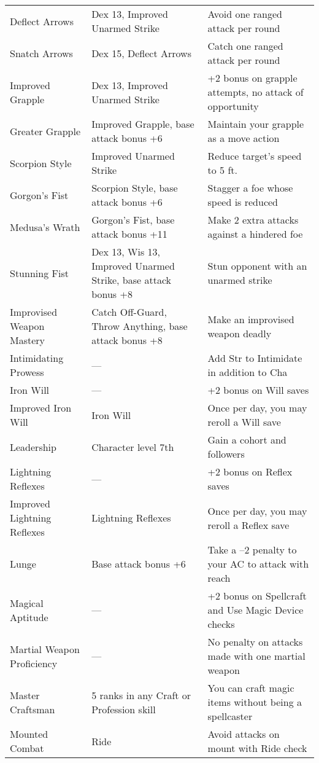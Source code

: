 \begin{table*}
\begin{tabularx}{\linewidth}{lXl}
\quad Deflect Arrows & Dex 13,  Improved Unarmed Strike & Avoid one ranged attack per round\\
\quad \quad Snatch Arrows & Dex 15, Deflect Arrows & Catch one ranged attack per round\\
\quad Improved Grapple & Dex 13, Improved Unarmed Strike & +2 bonus on grapple attempts, no attack of opportunity\\
\quad \quad Greater Grapple & Improved Grapple, base attack bonus +6 & Maintain your grapple as a move action\\
\quad Scorpion Style & Improved Unarmed Strike & Reduce target's speed to 5 ft.\\
\quad \quad Gorgon's Fist & Scorpion Style, base attack bonus +6 & Stagger a foe whose speed is reduced\\
\quad \quad \quad Medusa's Wrath & Gorgon's Fist, base attack bonus +11 & Make 2 extra attacks against a hindered foe\\
\quad Stunning Fist & Dex 13, Wis 13, Improved Unarmed Strike, base attack bonus +8 & Stun opponent with an unarmed strike\\
Improvised Weapon Mastery & Catch Off-Guard, Throw Anything, base attack bonus +8 & Make an improvised weapon deadly\\
Intimidating Prowess & --- & Add Str to Intimidate in addition to Cha \\
Iron Will & --- & +2 bonus on Will saves\\
\quad Improved Iron Will & Iron Will & Once per day, you may reroll a Will save\\
Leadership & Character level 7th & Gain a cohort and followers\\
Lightning Reflexes & --- & +2 bonus on Reflex saves\\
\quad Improved Lightning Reflexes & Lightning Reflexes & Once per day, you may reroll a Reflex save\\
Lunge & Base attack bonus +6 & Take a –2 penalty to your AC to attack with reach\\
Magical Aptitude & --- & +2 bonus on Spellcraft and Use Magic Device checks\\
Martial Weapon Proficiency & --- & No penalty on attacks made with one martial weapon\\
Master Craftsman & 5 ranks in any Craft or Profession skill & You can craft magic items without being a spellcaster\\
Mounted Combat & Ride & Avoid attacks on mount with Ride check\\

\end{tabularx}
\end{table*}

